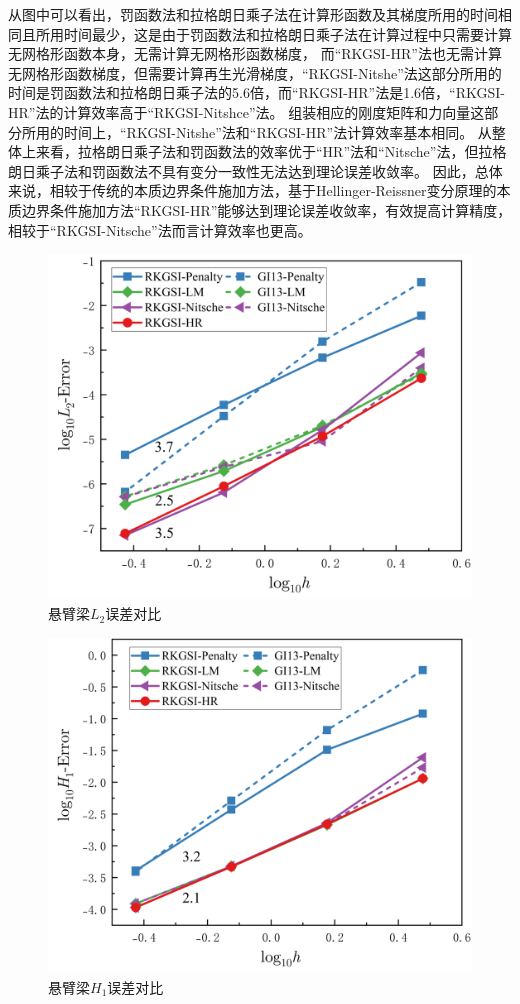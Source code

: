 从图中可以看出，罚函数法和拉格朗日乘子法在计算形函数及其梯度所用的时间相同且所用时间最少，这是由于罚函数法和拉格朗日乘子法在计算过程中只需要计算无网格形函数本身，无需计算无网格形函数梯度，
而“RKGSI-HR”法也无需计算无网格形函数梯度，但需要计算再生光滑梯度，“RKGSI-Nitshe”法这部分所用的时间是罚函数法和拉格朗日乘子法的5.6倍，而“RKGSI-HR”法是1.6倍，“RKGSI-HR”法的计算效率高于“RKGSI-Nitshce”法。
组装相应的刚度矩阵和力向量这部分所用的时间上，“RKGSI-Nitshe”法和“RKGSI-HR”法计算效率基本相同。
从整体上来看，拉格朗日乘子法和罚函数法的效率优于“HR”法和“Nitsche”法，但拉格朗日乘子法和罚函数法不具有变分一致性无法达到理论误差收敛率。
因此，总体来说，相较于传统的本质边界条件施加方法，基于Hellinger-Reissner变分原理的本质边界条件施加方法“RKGSI-HR”能够达到理论误差收敛率，有效提高计算精度，相较于“RKGSI-Nitsche”法而言计算效率也更高。
\begin{figure}[H]
    \centering
    \includegraphics[scale=0.5]{figure/EHR/cantilever/L2.png}
    \caption{悬臂梁$L_2$误差对比}\label{CL2}
\end{figure}
\begin{figure}[H]
    \centering
    \includegraphics[scale=0.5]{figure/EHR/cantilever/H1.png}
    \caption{悬臂梁$H_1$误差对比}\label{CH1}
\end{figure}
